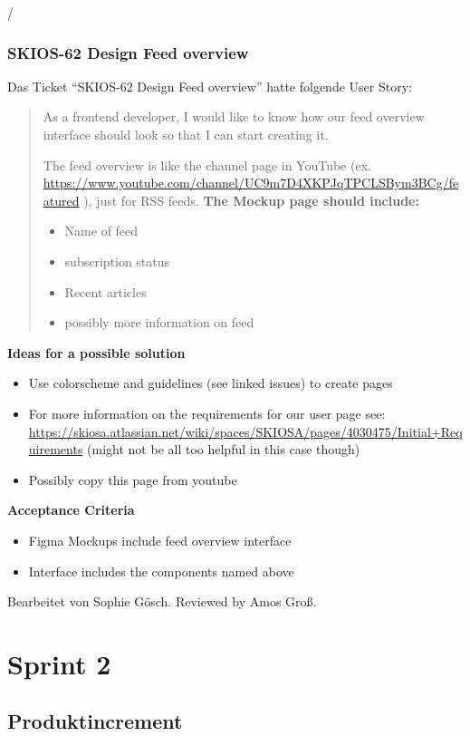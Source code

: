/\subsubsection{SKIOS-62 Design Feed overview}
Das Ticket \enquote{SKIOS-62 Design Feed overview} hatte folgende User Story:
\begin{quotation}
    As a frontend developer, I would like to know how our feed overview interface should look so that I can start creating it.

    The feed overview is like the channel page in YouTube (ex. \url{https://www.youtube.com/channel/UC9m7D4XKPJqTPCLSBym3BCg/featured} ), just for RSS feeds.
    \textbf{The Mockup page should include:}
        \begin{itemize}
            \item Name of feed
            \item subscription status
            \item Recent articles
            \item possibly more information on feed
        \end{itemize}
\end{quotation}
\textbf{Ideas for a possible solution}
    \begin{itemize}
        \item Use colorscheme and guidelines (see linked issues) to create pages
        \item For more information on the requirements for our user page see: \url{https://skiosa.atlassian.net/wiki/spaces/SKIOSA/pages/4030475/Initial+Requirements} (might not be all too helpful in this case though)
        \item Possibly copy this page from youtube
    \end{itemize}
\textbf{Acceptance Criteria}
    \begin{itemize}
        \item Figma Mockups include feed overview interface
        \item Interface includes the components named above
    \end{itemize}
Bearbeitet von Sophie Gösch.
Reviewed by Amos Groß.

\section{Sprint 2}
\subsection{Produktincrement}

